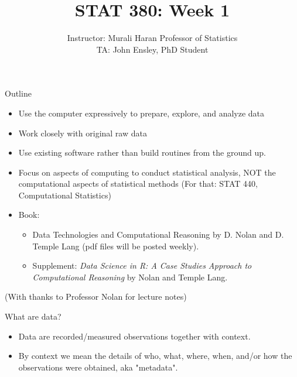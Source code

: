 \documentclass{beamer}\usepackage[]{graphicx}\usepackage[]{color}
\theoremstyle{mystyle}
\begin{document}

\title{
STAT 380: Week 1
}
\author{Instructor: Murali Haran Professor of Statistics\\ TA: John Ensley, PhD Student
}
\date{}

\begin{frame}
\titlepage
\end{frame}


\begin{frame}{Outline}
\begin{itemize}
\item Use the computer expressively to prepare, explore, and analyze data
\item Work closely with original raw data 
\item Use existing software rather than build routines from the ground up.
\item Focus on aspects of computing to conduct statistical analysis, NOT the computational aspects of statistical methods (For that: STAT 440, Computational Statistics)
\item Book: 
  \begin{itemize}
  \item Data Technologies and Computational Reasoning by D. Nolan and D. Temple Lang (pdf files will be posted weekly).
  \item Supplement: {\it Data Science in R: A Case Studies Approach to Computational Reasoning} by Nolan and Temple Lang.
  \end{itemize}
\end{itemize}
(With thanks to Professor Nolan for lecture notes)
\end{frame}

\begin{frame}{What are data?}
\begin{itemize}
\item Data are recorded/measured observations together with context. 

\item By context we mean the details of who, what, where, when, and/or how the observations were obtained, aka "metadata".
\end{itemize}

\end{frame}
\end{document}
